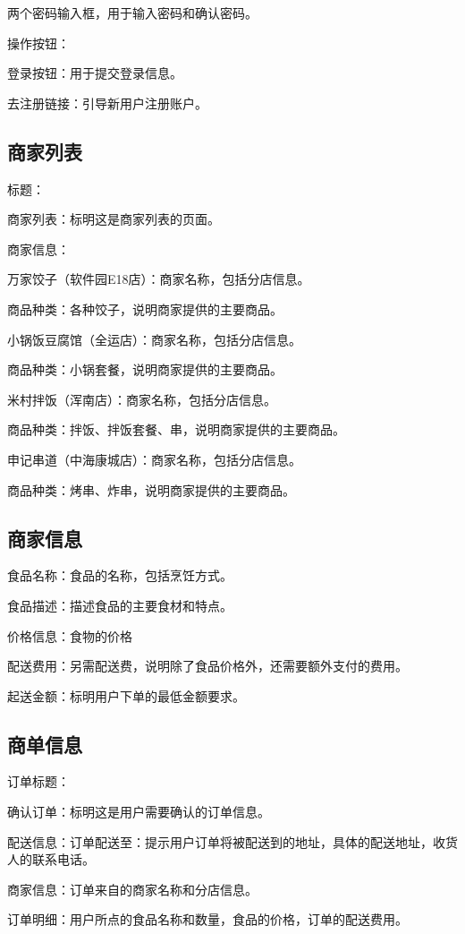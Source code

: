     两个密码输入框，用于输入密码和确认密码。

    操作按钮：

    登录按钮：用于提交登录信息。

    去注册链接：引导新用户注册账户。
\subsection{商家列表} 

    标题：

    商家列表：标明这是商家列表的页面。

    商家信息：

    万家饺子（软件园E18店）：商家名称，包括分店信息。

    商品种类：各种饺子，说明商家提供的主要商品。

    小锅饭豆腐馆（全运店）：商家名称，包括分店信息。

    商品种类：小锅套餐，说明商家提供的主要商品。

    米村拌饭（浑南店）：商家名称，包括分店信息。

    商品种类：拌饭、拌饭套餐、串，说明商家提供的主要商品。

    申记串道（中海康城店）：商家名称，包括分店信息。

    商品种类：烤串、炸串，说明商家提供的主要商品。
    \subsection{商家信息}
 

    食品名称：食品的名称，包括烹饪方式。

    食品描述：描述食品的主要食材和特点。

    价格信息：食物的价格

    配送费用：另需配送费，说明除了食品价格外，还需要额外支付的费用。

    起送金额：标明用户下单的最低金额要求。
    \subsection{商单信息}

    订单标题：

    确认订单：标明这是用户需要确认的订单信息。

    配送信息：订单配送至：提示用户订单将被配送到的地址，具体的配送地址，收货人的联系电话。

    商家信息：订单来自的商家名称和分店信息。

    订单明细：用户所点的食品名称和数量，食品的价格，订单的配送费用。

